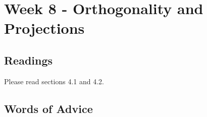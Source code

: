 	\clearpage



	\section{Week 8 - Orthogonality and Projections}

	\subsection{Readings}
		Please read sections 4.1 and 4.2.

	\subsection{Words of Advice}
